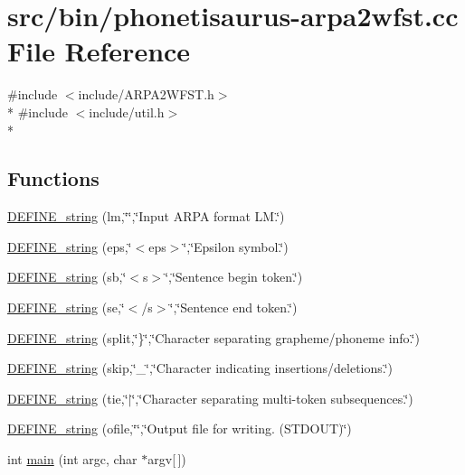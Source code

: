 \hypertarget{phonetisaurus-arpa2wfst_8cc}{}\section{src/bin/phonetisaurus-\/arpa2wfst.cc File Reference}
\label{phonetisaurus-arpa2wfst_8cc}
{\ttfamily \#include $<$include/\+A\+R\+P\+A2\+W\+F\+S\+T.\+h$>$}\\*
{\ttfamily \#include $<$include/util.\+h$>$}\\*
\subsection*{Functions}
\begin{DoxyCompactItemize}
\item 
\hyperlink{phonetisaurus-arpa2wfst_8cc_a8f2697874c4cb901f60afbbebbb5a8de}{D\+E\+F\+I\+N\+E\+\_\+string} (lm,\char`\"{}\char`\"{},\char`\"{}Input A\+R\+PA format L\+M.\char`\"{})
\item 
\hyperlink{phonetisaurus-arpa2wfst_8cc_ae1595814a6ef0dc3ac1d18c60dac9769}{D\+E\+F\+I\+N\+E\+\_\+string} (eps,\char`\"{}$<$eps$>$\char`\"{},\char`\"{}Epsilon symbol.\char`\"{})
\item 
\hyperlink{phonetisaurus-arpa2wfst_8cc_ab85c7d8ecb99957f29eecc5ccad72521}{D\+E\+F\+I\+N\+E\+\_\+string} (sb,\char`\"{}$<$s$>$\char`\"{},\char`\"{}Sentence begin token.\char`\"{})
\item 
\hyperlink{phonetisaurus-arpa2wfst_8cc_a4fb025f2d69c7833e70ed3b620ba44d4}{D\+E\+F\+I\+N\+E\+\_\+string} (se,\char`\"{}$<$/s$>$\char`\"{},\char`\"{}Sentence end token.\char`\"{})
\item 
\hyperlink{phonetisaurus-arpa2wfst_8cc_afdf53b3d4d4c49997a7fadd2aeae6b9c}{D\+E\+F\+I\+N\+E\+\_\+string} (split,\char`\"{}\}\char`\"{},\char`\"{}Character separating grapheme/phoneme info.\char`\"{})
\item 
\hyperlink{phonetisaurus-arpa2wfst_8cc_a21f7c06d8131a143c6e0f460a2ba0ac4}{D\+E\+F\+I\+N\+E\+\_\+string} (skip,\char`\"{}\+\_\+\char`\"{},\char`\"{}Character indicating insertions/deletions.\char`\"{})
\item 
\hyperlink{phonetisaurus-arpa2wfst_8cc_ae5a55108fddfd9190365407470f6cdbd}{D\+E\+F\+I\+N\+E\+\_\+string} (tie,\char`\"{}$\vert$\char`\"{},\char`\"{}Character separating multi-\/token subsequences.\char`\"{})
\item 
\hyperlink{phonetisaurus-arpa2wfst_8cc_a7d02519f45cba665e617899a67e34c1f}{D\+E\+F\+I\+N\+E\+\_\+string} (ofile,\char`\"{}\char`\"{},\char`\"{}Output file for writing. (S\+T\+D\+O\+UT)\char`\"{})
\item 
int \hyperlink{phonetisaurus-arpa2wfst_8cc_a0ddf1224851353fc92bfbff6f499fa97}{main} (int argc, char $\ast$argv\mbox{[}$\,$\mbox{]})
\end{DoxyCompactItemize}



